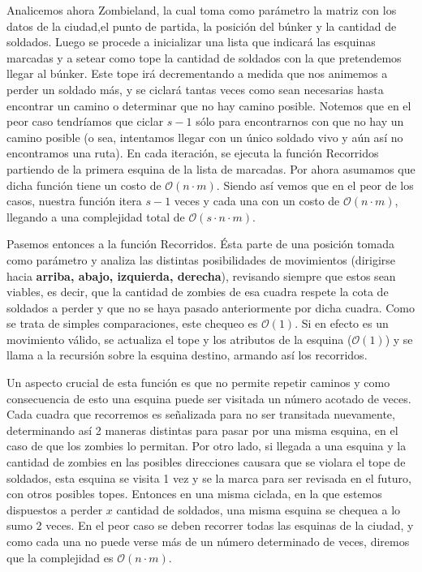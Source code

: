 Analicemos ahora {\sc Zombieland}, la cual toma como parámetro la matriz con los datos de la ciudad,el punto de partida, la posición del búnker y la cantidad de soldados. Luego se procede a inicializar una lista que indicará las esquinas marcadas y a setear como tope la cantidad de soldados con la que pretendemos llegar al búnker. Este tope irá decrementando a medida que nos animemos a perder un soldado más, y se ciclará tantas veces como sean necesarias hasta encontrar un camino o determinar que no hay camino posible. Notemos que en el peor caso tendríamos que ciclar $s-1$ sólo para encontrarnos con que no hay un camino posible (o sea, intentamos llegar con un único soldado vivo y aún así no encontramos una ruta). En cada iteración, se ejecuta la función {\sc Recorridos} partiendo de la primera esquina de la lista de marcadas. Por ahora asumamos que dicha función tiene un costo de $\mathcal{O}(n \cdot m)$. Siendo así vemos que en el peor de los casos, nuestra función itera $s-1$ veces y cada una con un costo de $\mathcal{O}(n \cdot m)$, llegando a una complejidad total de $\mathcal{O}(s \cdot n \cdot m)$.

Pasemos entonces a la función {\sc Recorridos}. Ésta parte de una posición tomada como parámetro y analiza las distintas posibilidades de movimientos (dirigirse hacia {\bf arriba, abajo, izquierda, derecha}), revisando siempre que estos sean viables, es decir, que la cantidad de zombies de esa cuadra respete la cota de soldados a perder y que no se haya pasado anteriormente por dicha cuadra. Como se trata de simples comparaciones, este chequeo es $\mathcal{O}(1)$. Si en efecto es un movimiento válido, se actualiza el tope y los atributos de la esquina ($\mathcal{O}(1)$) y se llama a la recursión sobre la esquina destino, armando así los recorridos.

Un aspecto crucial de esta función es que no permite repetir caminos y como consecuencia de esto una esquina puede ser visitada un número acotado de veces. Cada cuadra que recorremos es señalizada para no ser transitada nuevamente, determinando así 2 maneras distintas para pasar por una misma esquina, en el caso de que los zombies lo permitan. Por otro lado, si llegada a una esquina y la cantidad de zombies en las posibles direcciones causara que se violara el tope de soldados, esta esquina se visita 1 vez y se la marca para ser revisada en el futuro, con otros posibles topes. Entonces en una misma ciclada, en la que estemos dispuestos a perder $x$ cantidad de soldados, una misma esquina se chequea a lo sumo 2 veces. En el peor caso se deben recorrer todas las esquinas de la ciudad, y como cada una no puede verse más de un número determinado de veces, diremos que la complejidad es $\mathcal{O}(n \cdot m)$.


